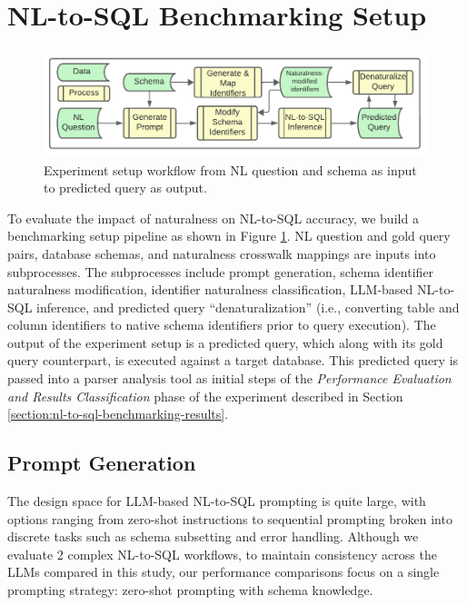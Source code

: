 \section{NL-to-SQL Benchmarking Setup}

\label{section:nl-to-sql-benchmarking-setup}

\begin{figure}[!h]
  \centering
  \includegraphics[width=\figwidthmod\linewidth]{figures/section-5-process-header.pdf}
  \caption{Experiment setup workflow from NL question and schema as input to predicted query as output.}
  \label{fig:section-5-process-header}
\end{figure}

To evaluate the impact of naturalness on NL-to-SQL accuracy, we build a benchmarking setup pipeline as shown in Figure \ref{fig:section-5-process-header}. 
NL question and gold query pairs, database schemas, and naturalness crosswalk mappings are inputs into subprocesses.
The subprocesses include prompt generation, schema identifier naturalness modification, identifier naturalness classification, LLM-based NL-to-SQL inference, and predicted query ``denaturalization'' (i.e., converting table and column identifiers to native schema identifiers prior to query execution).
The output of the experiment setup is a predicted query, which along with its gold query counterpart, is executed against a target database. 
This predicted query is passed into a parser analysis tool as initial steps of the \emph{Performance Evaluation and Results Classification} phase of the experiment described in Section \ref{section:nl-to-sql-benchmarking-results}.

\subsection{Prompt Generation}
The design space for LLM-based NL-to-SQL prompting is quite large, with options ranging from zero-shot instructions to sequential prompting broken into discrete tasks such as schema subsetting and error handling.
Although we evaluate 2 complex NL-to-SQL workflows, to maintain consistency across the LLMs compared in this study, our performance comparisons focus on a single prompting strategy: zero-shot prompting with schema knowledge.

